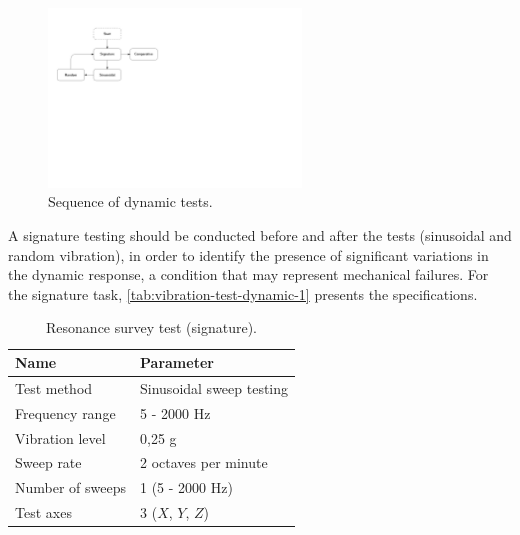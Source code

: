 \begin{figure}[!ht]
    \begin{center}
        \includegraphics[width=0.6\textwidth]{figures/vibration_procedure.pdf}
        \caption{Sequence of dynamic tests.}
        \label{fig:vibration_procedure}
    \end{center}
\end{figure}

A signature testing should be conducted before and after the tests (sinusoidal and random vibration), in order to identify the presence of significant variations in the dynamic response, a condition that may represent mechanical failures. For the signature task, \autoref{tab:vibration-test-dynamic-1} presents the specifications.

\begin{table}[!h]
    \begin{center}
        \begin{tabular}{ll}
            \toprule[1.5pt]
            \textbf{Name}    & \textbf{Parameter}       \\
            \midrule
            Test method      & Sinusoidal sweep testing \\
            Frequency range  & 5 - 2000 Hz              \\
            Vibration level  & 0,25 g                   \\
            Sweep rate       & 2 octaves per minute     \\
            Number of sweeps & 1 (5 - 2000 Hz)          \\
            Test axes        & 3 ($X$, $Y$, $Z$)        \\
            \bottomrule[1.5pt]
        \end{tabular}
        \caption{Resonance survey test (signature).}
        \label{tab:vibration-test-dynamic-1}
    \end{center}
\end{table}

